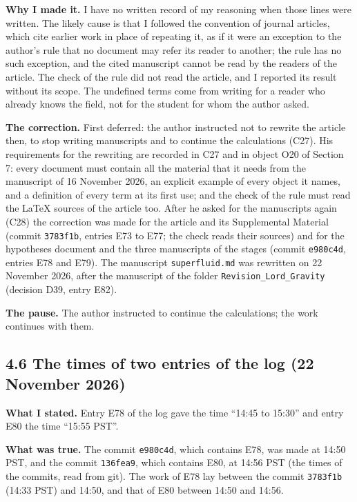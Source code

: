 \documentclass[
  10pt,
]{article}
\begin{document}
\textbf{Why I made it.} I have no written record of my reasoning when
those lines were written. The likely cause is that I followed the
convention of journal articles, which cite earlier work in place of
repeating it, as if it were an exception to the author's rule that no
document may refer its reader to another; the rule has no such
exception, and the cited manuscript cannot be read by the readers of the
article. The check of the rule did not read the article, and I reported
its result without its scope. The undefined terms come from writing for
a reader who already knows the field, not for the student for whom the
author asked.

\textbf{The correction.} First deferred: the author instructed not to
rewrite the article then, to stop writing manuscripts and to continue
the calculations (C27). His requirements for the rewriting are recorded
in C27 and in object O20 of Section 7: every document must contain all
the material that it needs from the manuscript of 16 November 2026, an
explicit example of every object it names, and a definition of every
term at its first use; and the check of the rule must read the LaTeX
sources of the article too. After he asked for the manuscripts again
(C28) the correction was made for the article and its Supplemental
Material (commit \texttt{3783f1b}, entries E73 to E77; the check reads
their sources) and for the hypotheses document and the three manuscripts
of the stages (commit \texttt{e980c4d}, entries E78 and E79). The
manuscript \texttt{superfluid.md} was rewritten on 22 November 2026,
after the manuscript of the folder \texttt{Revision\_Lord\_Gravity}
(decision D39, entry E82).

\textbf{The pause.} The author instructed to continue the calculations;
the work continues with them.

\hypertarget{the-times-of-two-entries-of-the-log-22-november-2026}{%
\subsection{4.6 The times of two entries of the log (22 November
2026)}\label{the-times-of-two-entries-of-the-log-22-november-2026}}

\textbf{What I stated.} Entry E78 of the log gave the time ``14:45 to
15:30'' and entry E80 the time ``15:55 PST''.

\textbf{What was true.} The commit \texttt{e980c4d}, which contains E78,
was made at 14:50 PST, and the commit \texttt{136fea9}, which contains
E80, at 14:56 PST (the times of the commits, read from git). The work of
E78 lay between the commit \texttt{3783f1b} (14:33 PST) and 14:50, and
that of E80 between 14:50 and 14:56.
\end{document}
